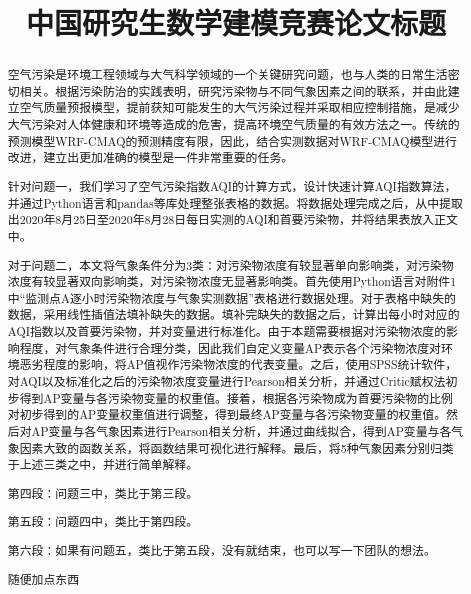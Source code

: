 \documentclass[bwprint]{gmcmthesis}
\title{中国研究生数学建模竞赛论文标题}
\numberwithin{figure}{section}
\begin{document}
 \maketitle
 \begin{abstract}
空气污染是环境工程领域与大气科学领域的一个关键研究问题，也与人类的日常生活密切相关。根据污染防治的实践表明，研究污染物与不同气象因素之间的联系，并由此建立空气质量预报模型，提前获知可能发生的大气污染过程并采取相应控制措施，是减少大气污染对人体健康和环境等造成的危害，提高环境空气质量的有效方法之一。传统的预测模型WRF-CMAQ的预测精度有限，因此，结合实测数据对WRF-CMAQ模型进行改进，建立出更加准确的模型是一件非常重要的任务。

针对问题一，我们学习了空气污染指数AQI的计算方式，设计快速计算AQI指数算法，并通过Python语言和pandas等库处理整张表格的数据。将数据处理完成之后，从中提取出2020年8月25日至2020年8月28日每日实测的AQI和首要污染物，并将结果表放入正文中。

对于问题二，本文将气象条件分为3类：对污染物浓度有较显著单向影响类，对污染物浓度有较显著双向影响类，对污染物浓度无显著影响类。首先使用Python语言对附件1中“监测点A逐小时污染物浓度与气象实测数据”表格进行数据处理。对于表格中缺失的数据，采用线性插值法填补缺失的数据。填补完缺失的数据之后，计算出每小时对应的AQI指数以及首要污染物，并对变量进行标准化。由于本题需要根据对污染物浓度的影响程度，对气象条件进行合理分类，因此我们自定义变量AP表示各个污染物浓度对环境恶劣程度的影响，将AP值视作污染物浓度的代表变量。之后，使用SPSS统计软件，对AQI以及标准化之后的污染物浓度变量进行Pearson相关分析，并通过Critic赋权法初步得到AP变量与各污染物变量的权重值。接着，根据各污染物成为首要污染物的比例对初步得到的AP变量权重值进行调整，得到最终AP变量与各污染物变量的权重值。然后对AP变量与各气象因素进行Pearson相关分析，并通过曲线拟合，得到AP变量与各气象因素大致的函数关系，将函数结果可视化进行解释。最后，将5种气象因素分别归类于上述三类之中，并进行简单解释。

第四段：问题三中，类比于第三段。

第五段：问题四中，类比于第四段。

第六段：如果有问题五，类比于第五段，没有就结束，也可以写一下团队的想法。

随便加点东西






\end{abstract}

\end{document}
